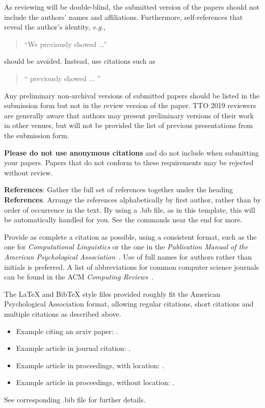 \documentclass[11pt,a4paper]{article}
\begin{document}
As reviewing will be double-blind, the submitted version of the papers
should not include the authors' names and affiliations. Furthermore,
self-references that reveal the author's identity, \emph{e.g.},
\begin{quote}
``We previously showed \cite{Gusfield:97} ...''  
\end{quote}
should be avoided. Instead, use citations such as 
\begin{quote}
``\citeauthor{Gusfield:97} 
previously showed ... ''
\end{quote}

Any preliminary non-archival versions of submitted papers should be listed in the submission form but not in the review version of the paper. TTO 2019 reviewers are generally aware that authors may present preliminary versions of their work in other venues, but will not be provided the list of previous presentations from the submission form. 


\textbf{Please do not use anonymous citations} and do not include
 when submitting your papers. Papers that do not
conform to these requirements may be rejected without review.

\textbf{References}: Gather the full set of references together under
the heading \textbf{References}. 
Arrange the references alphabetically
by first author, rather than by order of occurrence in the text.
By using a .bib file, as in this template, this will be automatically 
handled for you. See the \verb|| commands near the end for more.

Provide as complete a citation as possible, using a consistent format,
such as the one for \emph{Computational Linguistics\/} or the one in the 
\emph{Publication Manual of the American 
Psychological Association\/}~\cite{APA:83}. Use of full names for
authors rather than initials is preferred. A list of abbreviations
for common computer science journals can be found in the ACM 
\emph{Computing Reviews\/}~\cite{ACM:83}.

The \LaTeX{} and Bib\TeX{} style files provided roughly fit the
American Psychological Association format, allowing regular citations, 
short citations and multiple citations as described above.  

\begin{itemize}
\item Example citing an arxiv paper: \cite{rasooli-tetrault-2015}. 
\item Example article in journal citation: \cite{Ando2005}.
\item Example article in proceedings, with location: \cite{borsch2011}.
\item Example article in proceedings, without location: \cite{andrew2007scalable}.
\end{itemize}
See corresponding .bib file for further details.
\end{document}
